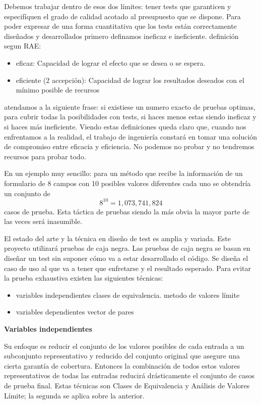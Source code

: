 Debemos trabajar dentro de esos dos límites: tener tests que garanticen y especifíquen el grado de calidad acotado al presupuesto que se dispone. Para poder expresar de una forma cuantitativa que los tests están correctamente diseñados y desarrollados primero definamos ineficaz e ineficiente. definición segun RAE:

\begin{itemize}
    \item eficaz: Capacidad de lograr el efecto que se desea o se espera.
    \item eficiente (2 accepción): Capacidad de lograr los resultados deseados con el mínimo posible de recursos
\end{itemize}

atendamos a la siguiente frase: si existiese un numero exacto de pruebas optimas, para cubrir todas la posibilidades con tests, si haces menos estas siendo ineficaz y si haces más ineficiente. Viendo estas definiciones queda claro que, cuando nos enfrentamos a la realidad, el trabajo de ingeniería constará en tomar una solución de compromiso entre eficacia y eficiencia. No podemos no probar y no tendremos recursos para probar todo.

En un ejemplo muy sencillo: para un método que recibe la información de un formulario de 8 campos con 10 posibles valores diferentes cada uno se obtendría un conjunto de \[ 8^{10} = 1,073,741,824 \] casos de prueba. Esta táctica de pruebas siendo la más obvia la mayor parte de las veces será inasumible.

El estado del arte y la técnica en diseño de test es amplia y variada. Este proyecto utilizará pruebas de caja negra. Las pruebas de caja negra se basan en diseñar un test sin suponer cómo va a estar desarrollado el código. Se diseña el caso de uso al que va a tener que enfretarse y el resultado esperado. Para evitar la prueba exhaustiva existen las siguientes técnicas:

\begin{itemize}
    \item variables independientes
    \subitem clases de equivalencia.
    \subitem metodo de valores límite
    \item variables dependientes
    \subitem vector de pares
\end{itemize}

\textbf{Variables independientes}

Su enfoque es reducir el conjunto de los valores posibles de cada entrada a un subconjunto representativo y reducido del conjunto original que asegure una cierta garantía de cobertura. Entonces la combinación de todos estos valores representativos de todas las entradas reducirá drásticamente el conjunto de casos de prueba final. Estas técnicas son Clases de Equivalencia y Análisis de Valores Límite; la segunda se aplica sobre la anterior.

